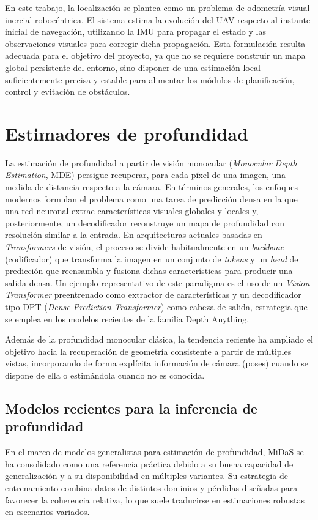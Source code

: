     En este trabajo, la localización se plantea como un problema de odometría visual-inercial robocéntrica. El sistema estima la evolución del
    UAV respecto al instante inicial de navegación, utilizando la IMU para propagar el estado y las observaciones visuales para corregir dicha
    propagación. Esta formulación resulta adecuada para el objetivo del proyecto, ya que no se requiere construir un mapa global persistente del
    entorno, sino disponer de una estimación local suficientemente precisa y estable para alimentar los módulos de planificación, control y
    evitación de obstáculos.
    
\section{Estimadores de profundidad}

    La estimación de profundidad a partir de visión monocular (\textit{Monocular Depth Estimation}, MDE) persigue recuperar, para cada 
    píxel de una imagen, una medida de distancia respecto a la cámara. En términos generales, los enfoques modernos formulan el problema 
    como una tarea de predicción densa en la que una red neuronal extrae características visuales globales y locales y, posteriormente, un 
    decodificador reconstruye un mapa de profundidad con resolución similar a la entrada. En arquitecturas actuales basadas en 
    \textit{Transformers} de visión, el proceso se divide habitualmente en un \textit{backbone} (codificador) que transforma la imagen en 
    un conjunto de \textit{tokens} y un \textit{head} de predicción que reensambla y fusiona dichas características para producir una salida 
    densa. Un ejemplo representativo de este paradigma es el uso de un \textit{Vision Transformer} preentrenado como extractor de 
    características y un decodificador tipo DPT (\textit{Dense Prediction Transformer}) como cabeza de salida, estrategia que se emplea en 
    los modelos recientes de la familia Depth Anything.

    Además de la profundidad monocular clásica, la tendencia reciente ha ampliado el objetivo hacia la recuperación de geometría consistente 
    a partir de múltiples vistas, incorporando de forma explícita información de cámara (poses) cuando se dispone de ella o estimándola 
    cuando no es conocida. 

    \subsection{Modelos recientes para la inferencia de profundidad}
    En el marco de modelos generalistas para estimación de profundidad, MiDaS se ha consolidado como una referencia práctica debido a su 
    buena capacidad de generalización y a su disponibilidad en múltiples variantes. Su estrategia de entrenamiento combina datos de 
    distintos dominios y pérdidas diseñadas para favorecer la coherencia relativa, lo que suele traducirse en estimaciones robustas en 
    escenarios variados.

